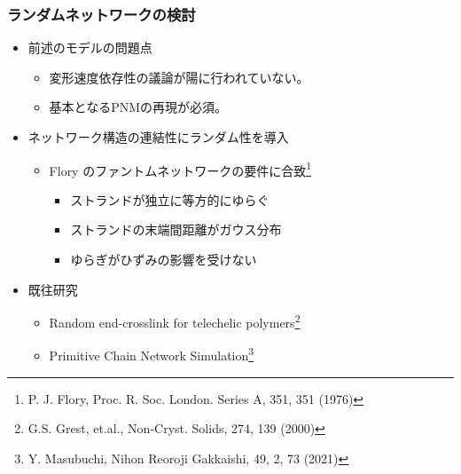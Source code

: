 \documentclass[12pt, dvipdfmx]{beamer}
\begin{document}
\begin{frame}
	\frametitle{ランダムネットワークの検討}
			\begin{itemize}
				\item 前述のモデルの問題点
				\begin{itemize}
					\item 変形速度依存性の議論が陽に行われていない。
					\item 基本となるPNMの再現が必須。
				\end{itemize}
				\item ネットワーク構造の連結性に\alert{ランダム性を導入}
                    \begin{itemize}
						\item \alert{Flory のファントムネットワークの要件に合致}\footnote{
							\scriptsize{P. J. Flory, Proc. R. Soc. London. Series A, 351, 351 (1976)}
						}
						\begin{itemize}
							\item ストランドが独立に等方的にゆらぐ
							\item ストランドの末端間距離がガウス分布
							\item ゆらぎがひずみの影響を受けない
						\end{itemize}
					\end{itemize}
				\item 既往研究
				\begin{itemize}
					\item Random end-crosslink for telechelic polymers\footnote{
						\scriptsize{G.S. Grest, et.al., Non-Cryst. Solids, 274, 139 (2000)}
						}
					\item Primitive Chain Network Simulation\footnote{
						\scriptsize{Y. Masubuchi, Nihon Reoroji Gakkaishi, 49, 2, 73 (2021)}
					}
				\end{itemize}
			\end{itemize}
\end{frame}
\end{document}
